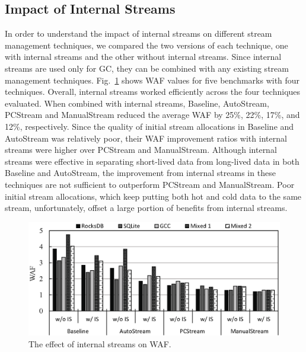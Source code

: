 \subsection{Impact of Internal Streams}

In order to understand the impact of internal streams on different stream
management techniques, we compared the two versions of each technique, one with
internal streams and the other without internal streams.  Since internal
streams are used only for GC, they can be combined with any
existing stream management techniques.  Fig.~\ref{fig:internal} shows WAF values
for five benchmarks with four techniques.  Overall, internal streams worked
efficiently across the four techniques evaluated.   When combined with
internal streams, \textsf{\small Baseline}, \textsf{\small AutoStream},
\textsf{\small PCStream} and \textsf{\small ManualStream} reduced the average
WAF by 25\%, 22\%, 17\%, and 12\%, respectively.  Since the quality of initial
stream allocations in \textsf{\small Baseline} and \textsf{\small AutoStream}
was relatively poor, their WAF improvement ratios with internal streams were
higher over \textsf{\small PCStream} and \textsf{\small ManualStream}.
Although internal streams were effective in separating short-lived data from
long-lived data in both \textsf{\small Baseline} and \textsf{\small
AutoStream}, the improvement from internal streams in these techniques are not
sufficient to outperform \textsf{\small PCStream} and \textsf{\small
ManualStream}.  Poor initial stream allocations, which keep putting both hot
and cold data to the same stream, unfortunately, offset a large portion of
benefits from internal streams.


\begin{figure}[t]
	\centering
	\includegraphics[width=1.\linewidth]{figure/internal}
	\caption{The effect of internal streams on WAF.}
	\vspace{-5pt}
	\label{fig:internal}
	\vspace{-10pt}
\end{figure}

